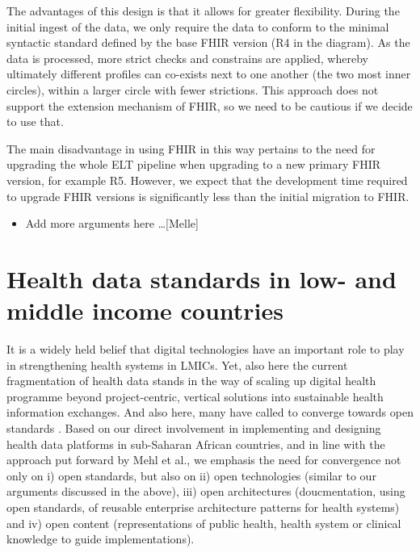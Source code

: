 \documentclass[
  authoryear]{elsarticle}
\providecommand{\tightlist}{%
  \setlength{\itemsep}{0pt}\setlength{\parskip}{0pt}}\usepackage{longtable,booktabs,array}
\begin{document}
The advantages of this design is that it allows for greater flexibility.
During the initial ingest of the data, we only require the data to
conform to the minimal syntactic standard defined by the base FHIR
version (R4 in the diagram). As the data is processed, more strict
checks and constrains are applied, whereby ultimately different profiles
can co-exists next to one another (the two most inner circles), within a
larger circle with fewer strictions. This approach does not support the
extension mechanism of FHIR, so we need to be cautious if we decide to
use that.

The main disadvantage in using FHIR in this way pertains to the need for
upgrading the whole ELT pipeline when upgrading to a new primary FHIR
version, for example R5. However, we expect that the development time
required to upgrade FHIR versions is significantly less than the initial
migration to FHIR.

\begin{itemize}
\tightlist
\item
  Add more arguments here \ldots{[}Melle{]}
\end{itemize}

\section{Health data standards in low- and middle income
countries}\label{health-data-standards-in-low--and-middle-income-countries}

It is a widely held belief that digital technologies have an important
role to play in strengthening health systems in LMICs. Yet, also here
the current fragmentation of health data stands in the way of scaling up
digital health programme beyond project-centric, vertical solutions into
sustainable health information exchanges. And also here, many have
called to converge towards open standards \citep{mehl2023fullstac}.
Based on our direct involvement in implementing and designing health
data platforms in sub-Saharan African countries, and in line with the
approach put forward by Mehl et al., we emphasis the need for
convergence not only on i) open standards, but also on ii) open
technologies (similar to our arguments discussed in the above), iii)
open architectures (doucmentation, using open standards, of reusable
enterprise architecture patterns for health systems) and iv) open
content (representations of public health, health system or clinical
knowledge to guide implementations).
\end{document}
